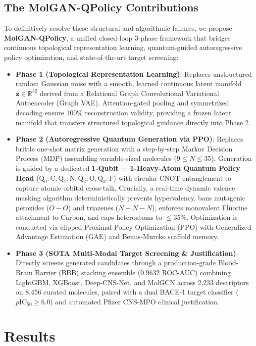 \documentclass[10pt,a4paper]{article}
\begin{document}
\subsection{The MolGAN-QPolicy Contributions}
To definitively resolve these structural and algorithmic failures, we propose \textbf{MolGAN-QPolicy}, a unified closed-loop 3-phase framework that bridges continuous topological representation learning, quantum-guided autoregressive policy optimization, and state-of-the-art target screening:
\begin{itemize}[noitemsep]
    \item \textbf{Phase 1 (Topological Representation Learning)}: Replaces unstructured random Gaussian noise with a smooth, learned continuous latent manifold $\mathbf{z} \in \mathbb{R}^{32}$ derived from a Relational Graph Convolutional Variational Autoencoder (Graph VAE). Attention-gated pooling and symmetrized decoding ensure 100\% reconstruction validity, providing a frozen latent manifold that transfers structured topological guidance directly into Phase 2.
    \item \textbf{Phase 2 (Autoregressive Quantum Generation via PPO)}: Replaces brittle one-shot matrix generation with a step-by-step Markov Decision Process (MDP) assembling variable-sized molecules ($9 \le N \le 35$). Generation is guided by a dedicated \textbf{1-Qubit = 1-Heavy-Atom Quantum Policy Head} ($\text{Q}_0: \text{C}, \text{Q}_1: \text{N}, \text{Q}_2: \text{O}, \text{Q}_3: \text{F}$) with circular CNOT entanglement to capture atomic orbital cross-talk. Crucially, a real-time dynamic valence masking algorithm deterministically prevents hypervalency, bans mutagenic peroxides ($O-O$) and triazenes ($N-N-N$), enforces monovalent Fluorine attachment to Carbon, and caps heteroatoms to $\le 35\%$. Optimization is conducted via clipped Proximal Policy Optimization (PPO) with Generalized Advantage Estimation (GAE) and Bemis-Murcko scaffold memory.
    \item \textbf{Phase 3 (SOTA Multi-Modal Target Screening \& Justification)}: Directly screens generated candidates through a production-grade Blood-Brain Barrier (BBB) stacking ensemble (0.9632 ROC-AUC) combining LightGBM, XGBoost, Deep-CNS-Net, and MolGCN across 2,233 descriptors on 8,456 curated molecules, paired with a dual BACE-1 target classifier ($p\text{IC}_{50} \ge 6.0$) and automated Pfizer CNS-MPO clinical justification.
\end{itemize}

\section{Results}
\end{document}
